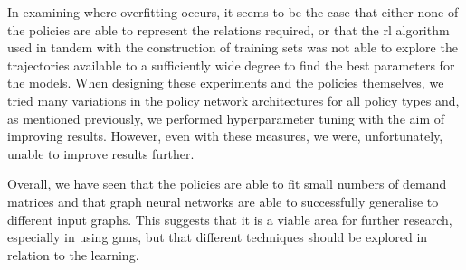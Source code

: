 In examining where overfitting occurs, it seems to be the case that either none of the policies are able to represent the relations required, or that the \ac{rl} algorithm used in tandem with the construction of training sets was not able to explore the trajectories available to a sufficiently wide degree to find the best parameters for the models. When designing these experiments and the policies themselves, we tried many variations in the policy network architectures for all policy types and, as mentioned previously, we performed hyperparameter tuning with the aim of improving results. However, even with these measures, we were, unfortunately, unable to improve results further.

Overall, we have seen that the policies are able to fit small numbers of demand matrices and that graph neural networks are able to successfully generalise to different input graphs. This suggests that it is a viable area for further research, especially in using \acp{gnn}, but that different techniques should be explored in relation to the learning.

